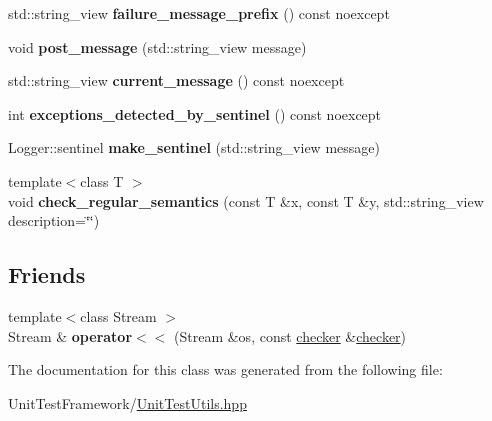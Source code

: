 \begin{DoxyCompactItemize}
std\+::string\+\_\+view {\bfseries failure\+\_\+message\+\_\+prefix} () const noexcept
\item 
\mbox{\label{classsequoia_1_1unit__testing_1_1checker_a9b2dd139191555e2747097af21e41ebc}} 
void {\bfseries post\+\_\+message} (std\+::string\+\_\+view message)
\item 
\mbox{\label{classsequoia_1_1unit__testing_1_1checker_aec24c240e0661c5e68c8db4fcf946931}} 
std\+::string\+\_\+view {\bfseries current\+\_\+message} () const noexcept
\item 
\mbox{\label{classsequoia_1_1unit__testing_1_1checker_ab5b5c1b4286ea3b819a1dc5d8f7bdc0e}} 
int {\bfseries exceptions\+\_\+detected\+\_\+by\+\_\+sentinel} () const noexcept
\item 
\mbox{\label{classsequoia_1_1unit__testing_1_1checker_a3fbed916003efdfc03fe4d44319d1d73}} 
Logger\+::sentinel {\bfseries make\+\_\+sentinel} (std\+::string\+\_\+view message)
\item 
\mbox{\label{classsequoia_1_1unit__testing_1_1checker_a37395d5f3ce3c550f4d167ccf96aec86}} 
{\footnotesize template$<$class T $>$ }\\void {\bfseries check\+\_\+regular\+\_\+semantics} (const T \&x, const T \&y, std\+::string\+\_\+view description=\char`\"{}\char`\"{})
\end{DoxyCompactItemize}
\subsection*{Friends}
\begin{DoxyCompactItemize}
\item 
\mbox{\label{classsequoia_1_1unit__testing_1_1checker_a522d030c42303fde9e1000c5447e05a6}} 
{\footnotesize template$<$class Stream $>$ }\\Stream \& {\bfseries operator$<$$<$} (Stream \&os, const \mbox{\hyperlink{classsequoia_1_1unit__testing_1_1checker}{checker}} \&\mbox{\hyperlink{classsequoia_1_1unit__testing_1_1checker}{checker}})
\end{DoxyCompactItemize}


The documentation for this class was generated from the following file\+:\begin{DoxyCompactItemize}
\item 
Unit\+Test\+Framework/\mbox{\hyperlink{_unit_test_utils_8hpp}{Unit\+Test\+Utils.\+hpp}}\end{DoxyCompactItemize}
